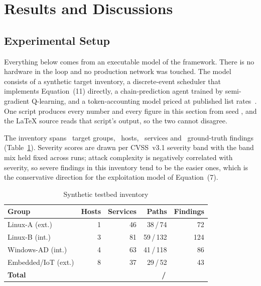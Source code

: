 \documentclass[journal]{IEEEtran}
\begin{document}
\section{Results and Discussions}

\subsection{Experimental Setup}

Everything below comes from an executable model of the framework. There is no
hardware in the loop and no production network was touched. The model consists
of a synthetic target inventory, a discrete-event scheduler that implements
Equation~(11) directly, a chain-prediction agent trained by semi-gradient
Q-learning, and a token-accounting model priced at published list
rates~\cite{anthropicmodels}. One script produces every number and every
figure in this section from seed \seedVal, and the LaTeX source reads that
script's output, so the two cannot disagree.

The inventory spans \numGroups\ target groups, \numHosts\ hosts, \numServices\
services and \numVuln\ ground-truth findings (Table~\ref{tab:testbed}).
Severity scores are drawn per CVSS~v3.1 severity band with the band mix held
fixed across runs; attack complexity is negatively correlated with severity,
so severe findings in this inventory tend to be the easier ones, which is the
conservative direction for the exploitation model of Equation~(7).

\begin{table}[!ht]
  \caption{Synthetic testbed inventory}
  \label{tab:testbed}
  \centering
  \small
  \begin{tabular}{@{}lrrrr@{}}
    \toprule
    \textbf{Group} & \textbf{Hosts} & \textbf{Services}
      & \textbf{Paths} & \textbf{Findings} \\
    \midrule
    Linux-A (ext.)      & 1 & 46 & 38\,/\,74  & 72  \\
    Linux-B (int.)      & 3 & 81 & 59\,/\,132 & 124 \\
    Windows-AD (int.)   & 4 & 63 & 41\,/\,118 & 86  \\
    Embedded/IoT (ext.) & 8 & 37 & 29\,/\,52  & 43  \\
    \midrule
    \textbf{Total} & \textbf{\numHosts} & \textbf{\numServices}
      & \textbf{\expO\,/\,\expT} & \textbf{\numVuln} \\
    \bottomrule
  \end{tabular}
\end{table}
\end{document}

